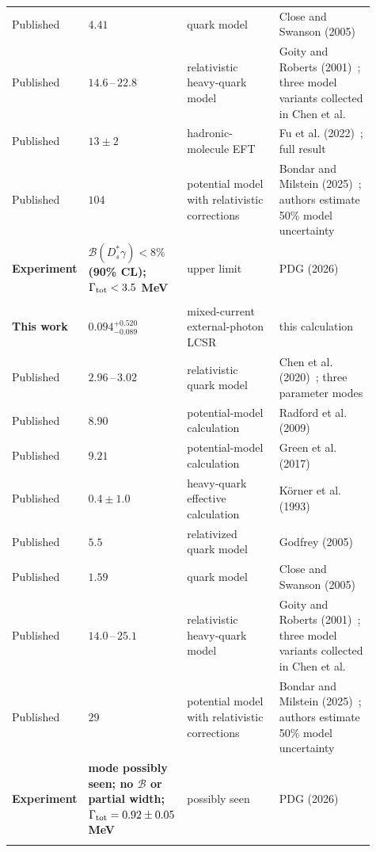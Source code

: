 {\begin{longtable}{>{\raggedright\arraybackslash}p{0.13\linewidth}>{\raggedright\arraybackslash}p{0.23\linewidth}>{\raggedright\arraybackslash}p{0.27\linewidth}>{\raggedright\arraybackslash}p{0.28\linewidth}}
Published & $4.41$ & quark model & Close and Swanson (2005)~\cite{CloseSwanson2005}\\
Published & $14.6\,\text{--}\,22.8$ & relativistic heavy-quark model & Goity and Roberts (2001)~\cite{GoityRoberts2001}; three model variants collected in Chen et al.\\
Published & $13\pm 2$ & hadronic-molecule EFT & Fu et al. (2022)~\cite{Fu2022}; full result\\
Published & $104$ & potential model with relativistic corrections & Bondar and Milstein (2025)~\cite{BondarMilstein2025}; authors estimate 50\% model uncertainty\\
\textbf{Experiment} & \textbf{$\mathcal B(D_s^\ast\gamma)<8\%$ (90\% CL); $\Gamma_{\rm tot}<3.5$ MeV} & upper limit & PDG (2026)~\cite{PDG2026}\\
\addlinespace[3pt]
\multicolumn{4}{l}{\textbf{$D_{s1}(2536)^+\to D_s^{\ast+}\gamma$}}\\
\textbf{This work} & \textbf{$0.094_{-0.089}^{+0.520}$} & mixed-current external-photon LCSR & this calculation\\
Published & $2.96\,\text{--}\,3.02$ & relativistic quark model & Chen et al. (2020)~\cite{Chen2020}; three parameter modes\\
Published & $8.90$ & potential-model calculation & Radford et al. (2009)~\cite{Radford2009}\\
Published & $9.21$ & potential-model calculation & Green et al. (2017)~\cite{Green2017}\\
Published & $0.4\pm 1.0$ & heavy-quark effective calculation & K{\"o}rner et al. (1993)~\cite{Korner1993}\\
Published & $5.5$ & relativized quark model & Godfrey (2005)~\cite{Godfrey2005}\\
Published & $1.59$ & quark model & Close and Swanson (2005)~\cite{CloseSwanson2005}\\
Published & $14.0\,\text{--}\,25.1$ & relativistic heavy-quark model & Goity and Roberts (2001)~\cite{GoityRoberts2001}; three model variants collected in Chen et al.\\
Published & $29$ & potential model with relativistic corrections & Bondar and Milstein (2025)~\cite{BondarMilstein2025}; authors estimate 50\% model uncertainty\\
\textbf{Experiment} & \textbf{mode possibly seen; no $\mathcal B$ or partial width; $\Gamma_{\rm tot}=0.92\pm0.05$ MeV} & possibly seen & PDG (2026)~\cite{PDG2026}\\
\pagebreak
\addlinespace[3pt]

\end{longtable}}
